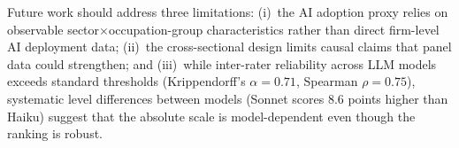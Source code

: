 \documentclass[11pt,a4paper]{article}
\theoremstyle{definition}
\begin{document}
Future work should address three limitations: (i)~the AI adoption proxy relies on observable sector$\times$occupation-group characteristics rather than direct firm-level AI deployment data; (ii)~the cross-sectional design limits causal claims that panel data could strengthen; and (iii)~while inter-rater reliability across LLM models exceeds standard thresholds (Krippendorff's $\alpha = 0.71$, Spearman $\rho = 0.75$), systematic level differences between models (Sonnet scores 8.6 points higher than Haiku) suggest that the absolute scale is model-dependent even though the ranking is robust.




\end{document}
